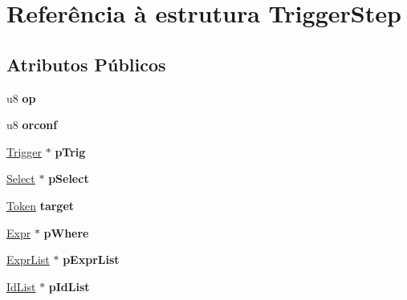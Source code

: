 \hypertarget{struct_trigger_step}{\section{Referência à estrutura Trigger\-Step}
\label{struct_trigger_step}
}
\subsection*{Atributos Públicos}
\begin{DoxyCompactItemize}
\item 
\hypertarget{struct_trigger_step_a20269855c80d869d498fcb93401832fd}{u8 {\bfseries op}}\label{struct_trigger_step_a20269855c80d869d498fcb93401832fd}

\item 
\hypertarget{struct_trigger_step_a4ed8b2571fde96e84f637184453e73e3}{u8 {\bfseries orconf}}\label{struct_trigger_step_a4ed8b2571fde96e84f637184453e73e3}

\item 
\hypertarget{struct_trigger_step_a70671e85796776db06c732ab6ae4ae0d}{\hyperlink{struct_trigger}{Trigger} $\ast$ {\bfseries p\-Trig}}\label{struct_trigger_step_a70671e85796776db06c732ab6ae4ae0d}

\item 
\hypertarget{struct_trigger_step_a90bf3353653cedf364a7fb2eb89a19c4}{\hyperlink{struct_select}{Select} $\ast$ {\bfseries p\-Select}}\label{struct_trigger_step_a90bf3353653cedf364a7fb2eb89a19c4}

\item 
\hypertarget{struct_trigger_step_a8b860bb5f466b1522125d446b58d860a}{\hyperlink{struct_token}{Token} {\bfseries target}}\label{struct_trigger_step_a8b860bb5f466b1522125d446b58d860a}

\item 
\hypertarget{struct_trigger_step_ad4c293b04dfda535f3aad5b9e02726c7}{\hyperlink{struct_expr}{Expr} $\ast$ {\bfseries p\-Where}}\label{struct_trigger_step_ad4c293b04dfda535f3aad5b9e02726c7}

\item 
\hypertarget{struct_trigger_step_a607602af65ecf6c7e6cac4ea8532ac1d}{\hyperlink{struct_expr_list}{Expr\-List} $\ast$ {\bfseries p\-Expr\-List}}\label{struct_trigger_step_a607602af65ecf6c7e6cac4ea8532ac1d}

\item 
\hypertarget{struct_trigger_step_a6b91bf578544104f8bd4bd5b958ddd8c}{\hyperlink{struct_id_list}{Id\-List} $\ast$ {\bfseries p\-Id\-List}}\label{struct_trigger_step_a6b91bf578544104f8bd4bd5b958ddd8c}


\end{DoxyCompactItemize}
